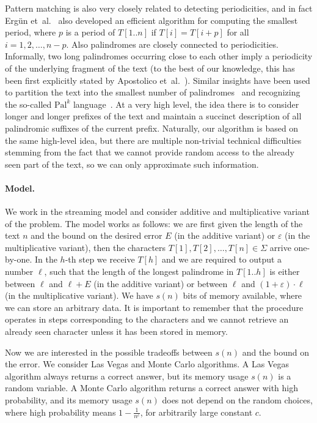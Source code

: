 \documentclass{article}[11pt,letter]
\newcommand{\head}{h}
\newcommand{\aerr}{\ensuremath{E}}
\newcommand{\etal}{et~al.}
\begin{document}
Pattern matching is also very closely related to detecting periodicities, and in fact Erg{\"u}n \etal~\cite{ErgunPeriodicity} also developed
an efficient algorithm for computing the smallest period, where $p$ is a period of $T[1..n]$ if $T[i]=T[i+p]$ for all $i=1,2,\ldots,n-p$. Also palindromes are closely connected to periodicities. Informally, two long
palindromes occurring close to each other imply a periodicity of the underlying fragment of the text
(to the best of our knowledge, this has been first explicitly stated by Apostolico \etal~\cite{Apostolico}).
Similar insights have been used to partition the text into the smallest number of palindromes~\cite{FiciGKK14,ISIBT14}
and recognizing the so-called $\text{Pal}^{k}$ language~\cite{KosolobovRS15}.
At a very high level, the idea there is to consider longer and longer prefixes of the text and maintain a succinct description
of all palindromic suffixes of the current prefix. Naturally, our algorithm is based on the same high-level idea, but there
are multiple non-trivial technical difficulties stemming from the fact that we cannot provide random access to the already
seen part of the text, so we can only approximate such information.

\paragraph{Model.} We work in the streaming model and consider additive and multiplicative variant of the problem.
The model works as follows: we are first given the length of the text $n$ and the bound on the desired error
$\aerr$ (in the additive variant) or $\varepsilon$ (in the multiplicative variant), then the characters
$T[1],T[2],\ldots,T[n]\in\Sigma$ arrive one-by-one. In the $h$-th step we receive $T[\head]$ and we are required to output a number $\ell$, such that the length of the longest palindrome in
$T[1..\head]$ is either between $\ell$ and $\ell+\aerr$ (in the additive variant) or between $\ell$ and $(1+\varepsilon)\cdot \ell$
(in the multiplicative variant). 
We have $s(n)$ bits of memory available, where we can store an arbitrary data.
It is important to remember that the procedure operates in steps corresponding
to the characters and we cannot retrieve an already seen character unless it has been stored in memory.

Now we are interested in the possible tradeoffs between $s(n)$ and the bound on the error.
We consider Las Vegas and Monte Carlo algorithms.
A Las Vegas algorithm always returns a correct answer, but its memory usage $s(n)$ is a random variable.
A Monte Carlo algorithm returns a correct answer with high probability, and its memory usage $s(n)$
does not depend on the random choices, where high probability means $1-\frac{1}{n^{c}}$, for arbitrarily large constant $c$.
\end{document}
